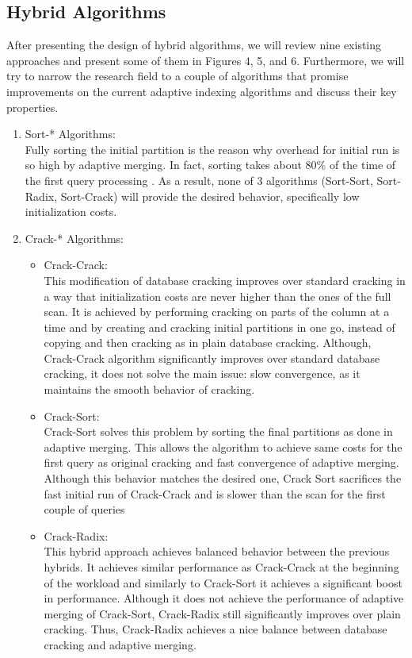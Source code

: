 \documentclass[10pt, conference, compsocconf]{IEEEtran}
\begin{document}
\subsection{Hybrid Algorithms}
\label{subsec:hybrid_algo}
After presenting the design of hybrid algorithms, we will review nine existing approaches and present some of them in Figures 4, 5, and 6. Furthermore, we will try to narrow the research field to a couple of algorithms that promise improvements on the current adaptive indexing algorithms and discuss their key properties.
\begin{enumerate}
\item{Sort-* Algorithms:} \\
Fully sorting the initial partition is the reason why overhead for initial run is so high by adaptive merging. In fact, sorting takes about 80\% of the time of the first query processing \cite{hybrid}. As a result, none of 3 algorithms (Sort-Sort, Sort-Radix, Sort-Crack) will provide the desired behavior, specifically low initialization costs.\\

\item{Crack-* Algorithms:}
\begin{itemize}
\item{Crack-Crack:}\\
This modification of database cracking improves over standard cracking in a way that initialization costs are never higher than the ones of the full scan. It is achieved by performing cracking on parts of the column at a time and by creating and cracking initial partitions in one go, instead of copying and then cracking as in plain database cracking. Although, Crack-Crack algorithm significantly improves over standard database cracking, it does not solve the main issue: slow convergence, as it maintains the smooth behavior of cracking.\\
\item{Crack-Sort:}\\
Crack-Sort solves this problem by sorting the final partitions as done in adaptive merging. This allows the algorithm to achieve same costs for the first query as original cracking and fast convergence of adaptive merging. Although this behavior matches the desired one, Crack Sort sacrifices the fast initial run of Crack-Crack and is slower than the scan for the first couple of queries\\
\item{Crack-Radix:}\\
This hybrid approach achieves balanced behavior between the previous hybrids. It achieves similar performance as Crack-Crack at the beginning of the workload and similarly to Crack-Sort it achieves a significant boost in performance. Although it does not achieve the performance of adaptive merging of Crack-Sort, Crack-Radix still significantly improves over plain cracking. Thus, Crack-Radix achieves a nice balance between database cracking and adaptive merging.\\
\end{itemize}


\end{enumerate}
\end{document}
